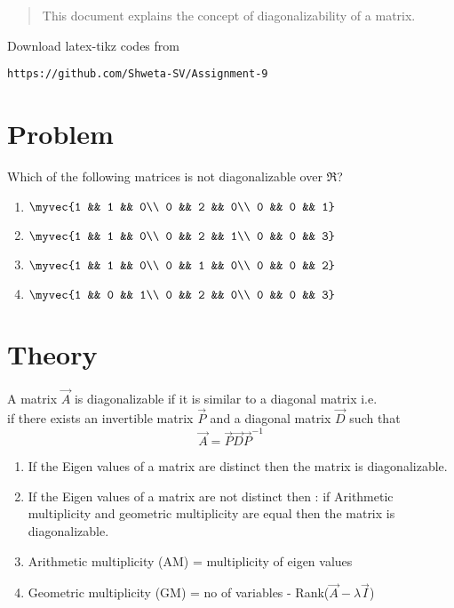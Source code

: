 \documentclass[journal,12pt,twocolumn]{IEEEtran}
\begin{document}
%
\vspace{2ex}
\begin{center}
\end{center}
\begin{abstract}
This document explains the concept of diagonalizability of a matrix.
\end{abstract}
%
Download latex-tikz codes from 
%
\begin{lstlisting}
https://github.com/Shweta-SV/Assignment-9
\end{lstlisting}
%
\section{Problem}
Which of the following matrices is not diagonalizable over $\Re$?\\
\begin{enumerate}
\item $
\myvec{1 && 1 && 0\\ 0 && 2 && 0\\ 0 && 0 && 1}
$\\
\item $
\myvec{1 && 1 && 0\\ 0 && 2 && 1\\ 0 && 0 && 3}
$\\
\item $
\myvec{1 && 1 && 0\\ 0 && 1 && 0\\ 0 && 0 && 2}
$\\
\item $
\myvec{1 && 0 && 1\\ 0 && 2 && 0\\ 0 && 0 && 3}
$\\
\end{enumerate}
\section{Theory}
A matrix $\vec{A}$ is diagonalizable if it is similar to a diagonal matrix i.e.\\
if there exists an invertible matrix $\vec{P}$ and a diagonal matrix $\vec{D}$ such that 
\begin{equation}\label{2.0.1}
\vec{A} = \vec{P}\vec{D}\vec{P}^{-1}
\end{equation}
\begin{enumerate}
\item If the Eigen values of a matrix are distinct then the matrix is diagonalizable.
\item If the Eigen values of a matrix are not distinct then : if Arithmetic multiplicity and geometric multiplicity are equal then the matrix is diagonalizable.
\item Arithmetic multiplicity (AM) = multiplicity of eigen values 
\item Geometric multiplicity (GM) = no of variables - Rank($\vec{A}-\lambda \vec{I}$)
\end{enumerate}
\end{document}
